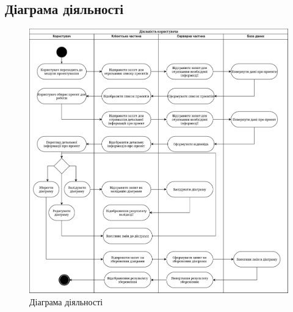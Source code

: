 \documentclass[oneside,14pt]{extarticle}
\begin{document}
\begin{normalsize}
	\subsection{Діаграма діяльності}
	\begin{figure}[H]
		\centering
		\includegraphics[width=\columnwidth]{4}
		\caption{Діаграма діяльності}
	\end{figure}
	

\end{normalsize}
\end{document}
